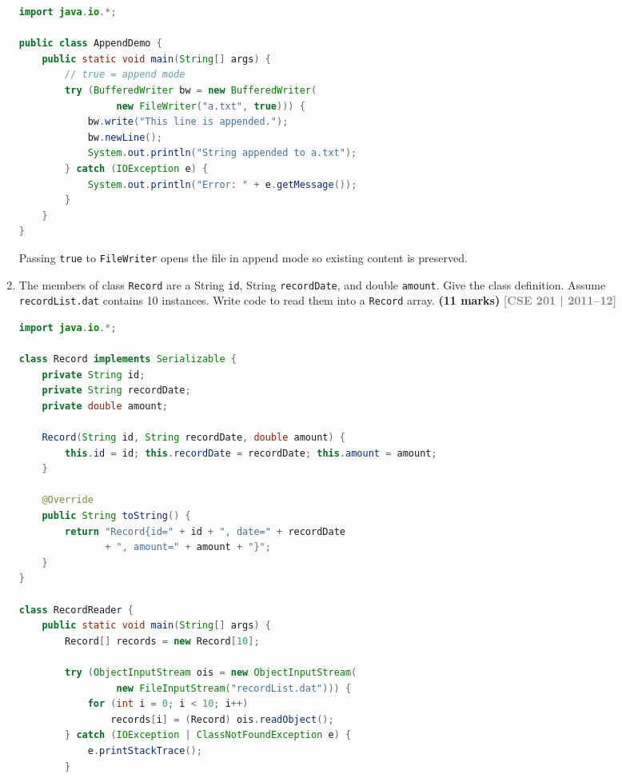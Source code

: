\documentclass[12pt,a3paper]{article}
\newcommand{\yr}[1]{\hfill\textcolor{gray}{\small\textbf{[#1]}}}
\newcommand{\mk}[1]{\textcolor{orange!70!black}{\small\textbf{(#1 marks)}}}
\begin{document}
\begin{enumerate}
\begin{tcolorbox}[enhanced,breakable,ansbox,
  colback=cA!4,colframe=cA,boxrule=0.8pt,arc=5pt,
  title={\textbf{Answer --- BufferedReader and Appending to a File}},
  fonttitle=\bfseries\color{white},colbacktitle=cA]
\begin{lstlisting}[language=Java]
import java.io.*;

public class AppendDemo {
    public static void main(String[] args) {
        // true = append mode
        try (BufferedWriter bw = new BufferedWriter(
                 new FileWriter("a.txt", true))) {
            bw.write("This line is appended.");
            bw.newLine();
            System.out.println("String appended to a.txt");
        } catch (IOException e) {
            System.out.println("Error: " + e.getMessage());
        }
    }
}
\end{lstlisting}
Passing \texttt{true} to \texttt{FileWriter} opens the file in append
mode so existing content is preserved.
\end{tcolorbox}

\item The members of class \texttt{Record} are a String \texttt{id}, String \texttt{recordDate}, and double \texttt{amount}. Give the class definition. Assume \texttt{recordList.dat} contains 10 instances. Write code to read them into a \texttt{Record} array. \mk{11}
\yr{CSE 201 | 2011--12}

\begin{tcolorbox}[enhanced,breakable,ansbox,
  colback=cA!4,colframe=cA,boxrule=0.8pt,arc=5pt,
  title={\textbf{Answer --- Record Class and Reading 10 Objects from File}},
  fonttitle=\bfseries\color{white},colbacktitle=cA]
\begin{lstlisting}[language=Java]
import java.io.*;

class Record implements Serializable {
    private String id;
    private String recordDate;
    private double amount;

    Record(String id, String recordDate, double amount) {
        this.id = id; this.recordDate = recordDate; this.amount = amount;
    }

    @Override
    public String toString() {
        return "Record{id=" + id + ", date=" + recordDate
               + ", amount=" + amount + "}";
    }
}

class RecordReader {
    public static void main(String[] args) {
        Record[] records = new Record[10];

        try (ObjectInputStream ois = new ObjectInputStream(
                 new FileInputStream("recordList.dat"))) {
            for (int i = 0; i < 10; i++)
                records[i] = (Record) ois.readObject();
        } catch (IOException | ClassNotFoundException e) {
            e.printStackTrace();
        }


\end{lstlisting}
\end{tcolorbox}
\end{enumerate}
\end{document}
